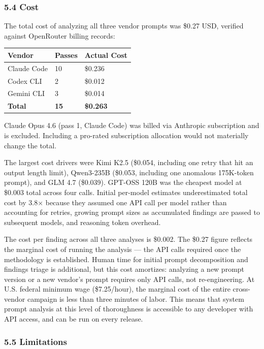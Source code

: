 \documentclass[
]{article}
\begin{document}
\hypertarget{cost}{%
\subsubsection{5.4 Cost}\label{cost}}

The total cost of analyzing all three vendor prompts was \$0.27 USD,
verified against OpenRouter billing records:

\begin{longtable}[]{@{}lll@{}}
\toprule\noalign{}
Vendor & Passes & Actual Cost \\
\midrule\noalign{}
\endhead
\bottomrule\noalign{}
\endlastfoot
Claude Code & 10 & \$0.236 \\
Codex CLI & 2 & \$0.012 \\
Gemini CLI & 3 & \$0.014 \\
\textbf{Total} & \textbf{15} & \textbf{\$0.263} \\
\end{longtable}

Claude Opus 4.6 (pass 1, Claude Code) was billed via Anthropic
subscription and is excluded. Including a pro-rated subscription
allocation would not materially change the total.

The largest cost drivers were Kimi K2.5 (\$0.054, including one retry
that hit an output length limit), Qwen3-235B (\$0.053, including one
anomalous 175K-token prompt), and GLM 4.7 (\$0.039). GPT-OSS 120B was
the cheapest model at \$0.003 total across four calls. Initial per-model
estimates underestimated total cost by 3.8× because they assumed one API
call per model rather than accounting for retries, growing prompt sizes
as accumulated findings are passed to subsequent models, and reasoning
token overhead.

The cost per finding across all three analyses is \$0.002. The \$0.27
figure reflects the marginal cost of running the analysis --- the API
calls required once the methodology is established. Human time for
initial prompt decomposition and findings triage is additional, but this
cost amortizes: analyzing a new prompt version or a new vendor's prompt
requires only API calls, not re-engineering. At U.S. federal minimum
wage (\$7.25/hour), the marginal cost of the entire cross-vendor
campaign is less than three minutes of labor. This means that system
prompt analysis at this level of thoroughness is accessible to any
developer with API access, and can be run on every release.

\hypertarget{limitations}{%
\subsubsection{5.5 Limitations}\label{limitations}}
\end{document}
